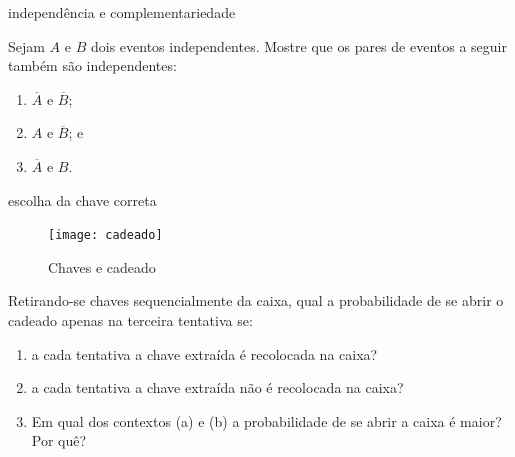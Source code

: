 \begin{task}{independência e complementariedade}


Sejam \(A\) e \(B\) dois eventos independentes.  Mostre que os pares de eventos a seguir também são independentes:
\begin{enumerate}
\item {} 
\(\overline{A}\) e \(\overline{B}\);

\item {} 
\(A\) e \(\overline{B}\); e

\item {} 
\(\overline{A}\) e \(B\).

\end{enumerate}
\end{task}

\begin{task}{escolha da chave correta}


\begin{figure}[H]
\centering
\texttt{[image: cadeado]}

\caption{Chaves e cadeado}
\label{}
\end{figure}
Retirando-se chaves sequencialmente da caixa, qual a probabilidade de se abrir o cadeado apenas na terceira tentativa se:
\begin{enumerate}
\item a cada tentativa a chave extraída é recolocada na caixa?
\item a cada tentativa a chave extraída não é recolocada na caixa?
\item Em qual dos contextos (a) e (b) a probabilidade de se abrir a caixa é maior? Por quê?
\end{enumerate}

\end{task}

